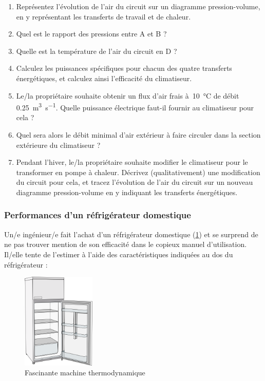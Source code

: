 	\begin{enumerate}
		\item Représentez l’évolution de l’air du circuit sur un diagramme pression-volume, en y représentant les transferts de travail et de chaleur.
		\item Quel est le rapport des pressions entre A et B ?
		\item Quelle est la température de l’air du circuit en D ?
		\item Calculez les puissances spécifiques pour chacun des quatre transferts énergétiques, et calculez ainsi l’efficacité du climatiseur.
		\item Le/la propriétaire souhaite obtenir un flux d’air frais à~\SI{10}{\degreeCelsius} de débit \SI{0,25}{\metre\cubed\per\second}. Quelle puissance électrique faut-il fournir au climatiseur pour cela ?
		\item Quel sera alors le débit minimal d’air extérieur à faire circuler dans la section extérieure du climatiseur ?
		\item Pendant l’hiver, le/la propriétaire souhaite modifier le climatiseur pour le transformer en pompe à chaleur. Décrivez (qualitativement) une modification du circuit pour cela, et tracez l’évolution de l’air du circuit sur un nouveau diagramme pression-volume en y indiquant les transferts énergétiques.
	\end{enumerate}


\subsubsection{Performances d’un réfrigérateur domestique}

	Un/e ingénieur/e fait l’achat d’un réfrigérateur domestique (\cref{fig_exo_refrigerator}) et se surprend de ne pas trouver mention de son efficacité dans le copieux manuel d’utilisation. Il/elle tente de l’estimer à l’aide des caractéristiques indiquées au dos du réfrigérateur :
		
	\begin{figure}
		\begin{center}
		\includegraphics[width=3.5cm]{images/refrigerator.png}
		\end{center}
		\caption{Fascinante machine thermodynamique}
		\label{fig_exo_refrigerator}
	\end{figure}
		
